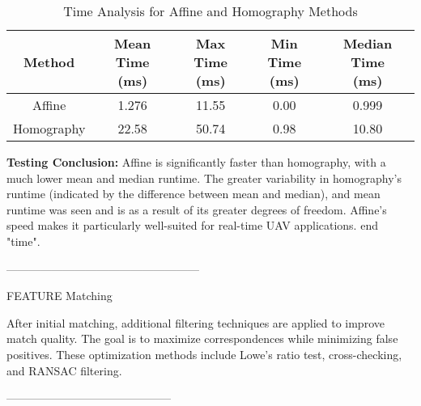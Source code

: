 \begin{table}[H]
    \centering
    \begin{tabular}{|c|c|c|c|c|}
        \hline
        \textbf{Method} & \makecell{\textbf{Mean Time} \\ \textbf{(ms)}} & \makecell{\textbf{Max Time} \\ \textbf{(ms)}} & \makecell{\textbf{Min Time} \\ \textbf{(ms)}} & \makecell{\textbf{Median Time} \\ \textbf{(ms)}} \\
        \hline
        Affine & 1.276 & 11.55 & 0.00 & 0.999 \\  
        Homography & 22.58 & 50.74 & 0.98 & 10.80 \\  
        \hline
    \end{tabular}
    \caption{Time Analysis for Affine and Homography Methods}
\end{table}

\textbf{Testing Conclusion:} Affine is significantly faster than homography, with a much lower mean and median runtime. The greater variability in homography’s runtime (indicated by the difference between mean and median), and mean runtime was seen and is as a result of its greater degrees of freedom. Affine’s speed makes it particularly well-suited for real-time UAV applications.
end "time". 






---------------------------------------------------






FEATURE Matching

After initial matching, additional filtering techniques are applied to improve match quality. The goal is to maximize correspondences while minimizing false positives. These optimization methods include Lowe’s ratio test, cross-checking, and RANSAC filtering.




--------------------------------------------